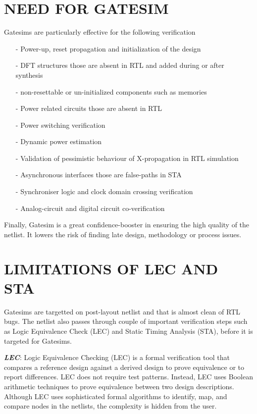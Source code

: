 \section {NEED FOR GATESIM}
Gatesims are particularly effective for the following verification
\begin{itemize}
	\item[-]Power-up, reset propagation and initialization of the design
	\item[-]DFT structures those are absent in RTL and added during or after synthesis
	\item[-]non-resettable or un-initialized components such as memories
	\item[-]Power related circuits those are absent in RTL
	\item[-]Power switching verification
	\item[-]Dynamic power estimation
	\item[-]Validation of pessimistic behaviour of X-propagation in RTL simulation
	\item[-]Asynchronous interfaces those are false-paths in STA
	\item[-]Synchroniser logic and clock domain crossing verification
	\item[-]Analog-circuit and digital circuit co-verification
\end{itemize}

Finally, Gatesim is a great confidence-booster in ensuring the high quality of the netlist. It lowers the risk of finding late design, methodology or process issues.




\section{LIMITATIONS OF LEC AND STA}

Gatesims are targetted on post-layout netlist and that is almost clean of RTL bugs. The netlist also passes through couple of important verification steps such as Logic Equivalence Check (LEC) and Static Timing Analysis (STA), before it is targeted for Gatesims.

\emph {\bf LEC}: Logic Equivalence Checking (LEC) is a formal verification tool that compares a reference design against a derived design to prove equivalence or to report differences.  LEC does not require test patterns. Instead, LEC uses Boolean arithmetic techniques to prove equivalence between two design descriptions\cite{ieee:boolean}. Although LEC uses sophisticated formal algorithms to identify, map, and compare nodes in the netlists, the complexity is hidden from the user\cite{lec}. %

